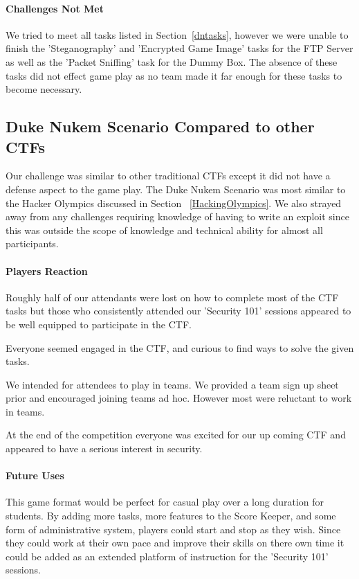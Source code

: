 \documentclass[10pt]{article}
\begin{document}
\paragraph*{Challenges Not Met}
We tried to meet all tasks listed in Section~\ref{dntasks}, however we were
unable to finish the 'Steganography' and 'Encrypted Game Image' tasks for
the FTP Server as well as the 'Packet Sniffing' task for the Dummy Box. 
The absence of these tasks did not effect game play as no team made it far enough 
for these tasks to become necessary.

\subsection{Duke Nukem Scenario Compared to other CTFs}
Our challenge was similar to other traditional CTFs except it did not have a
defense aspect to the game play. The Duke Nukem Scenario was most similar to the
Hacker Olympics discussed in Section ~\ref{HackingOlympics}. We also strayed
away from any challenges requiring knowledge of having to write an exploit
since this was outside the scope of knowledge and technical ability for almost all
participants.

\paragraph*{Players Reaction}
Roughly half of our attendants were lost on how to complete most of the CTF
tasks but those who consistently attended our 'Security 101' sessions appeared
to be well equipped to participate in the CTF.

Everyone seemed engaged in the CTF, and curious to find 
ways to solve the given tasks.

We intended for attendees to play in teams. We provided a team sign up sheet
prior and encouraged joining teams ad hoc. However most were
reluctant to work in teams. 

At the end of the competition everyone was excited for our up coming CTF and
appeared to have a serious interest in security.

\paragraph*{Future Uses}
This game format would be perfect for casual play over a long duration for
students. By adding more tasks, more features to the Score Keeper, and some form
of administrative system, players could start and stop as they wish. Since
they could work at their own pace and improve their skills on there own time it could be 
added as an extended platform of instruction for the 'Security 101' sessions. 
\end{document}
